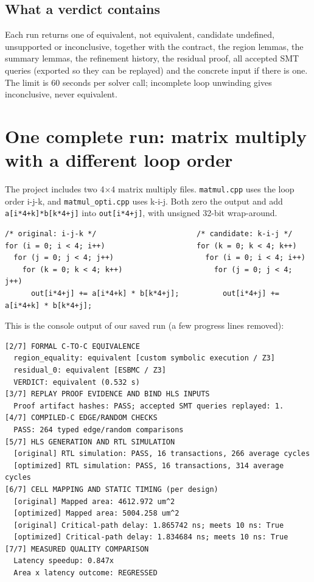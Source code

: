 \documentclass[10pt,a4paper]{article}
\begin{document}
\subsection{What a verdict contains}
Each run returns one of equivalent, not equivalent, candidate undefined, unsupported or inconclusive,
together with the contract, the region lemmas, the summary lemmas, the refinement history, the
residual proof, all accepted SMT queries (exported so they can be replayed) and the concrete input
if there is one. The limit is 60 seconds per solver call; incomplete loop unwinding gives
inconclusive, never equivalent.

\section{One complete run: matrix multiply with a different loop order}
The project includes two 4$\times$4 matrix multiply files. \texttt{matmul.cpp} uses the loop order
i-j-k, and \texttt{matmul\_opti.cpp} uses k-i-j. Both zero the output and add
\texttt{a[i*4+k]*b[k*4+j]} into \texttt{out[i*4+j]}, with unsigned 32-bit wrap-around.
\begin{lstlisting}
/* original: i-j-k */                       /* candidate: k-i-j */
for (i = 0; i < 4; i++)                     for (k = 0; k < 4; k++)
  for (j = 0; j < 4; j++)                     for (i = 0; i < 4; i++)
    for (k = 0; k < 4; k++)                     for (j = 0; j < 4; j++)
      out[i*4+j] += a[i*4+k] * b[k*4+j];          out[i*4+j] += a[i*4+k] * b[k*4+j];
\end{lstlisting}
This is the console output of our saved run (a few progress lines removed):
\begin{lstlisting}[language={}]
[2/7] FORMAL C-TO-C EQUIVALENCE
  region_equality: equivalent [custom symbolic execution / Z3]
  residual_0: equivalent [ESBMC / Z3]
  VERDICT: equivalent (0.532 s)
[3/7] REPLAY PROOF EVIDENCE AND BIND HLS INPUTS
  Proof artifact hashes: PASS; accepted SMT queries replayed: 1.
[4/7] COMPILED-C EDGE/RANDOM CHECKS
  PASS: 264 typed edge/random comparisons
[5/7] HLS GENERATION AND RTL SIMULATION
  [original] RTL simulation: PASS, 16 transactions, 266 average cycles
  [optimized] RTL simulation: PASS, 16 transactions, 314 average cycles
[6/7] CELL MAPPING AND STATIC TIMING (per design)
  [original] Mapped area: 4612.972 um^2
  [optimized] Mapped area: 5004.258 um^2
  [original] Critical-path delay: 1.865742 ns; meets 10 ns: True
  [optimized] Critical-path delay: 1.834684 ns; meets 10 ns: True
[7/7] MEASURED QUALITY COMPARISON
  Latency speedup: 0.847x
  Area x latency outcome: REGRESSED
\end{lstlisting}
\end{document}
